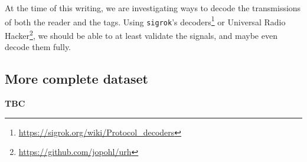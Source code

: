 At the time of this writing, we are investigating ways to decode the transmissions of both the reader and the tags. Using \texttt{sigrok}'s decoders\footnote{\url{https://sigrok.org/wiki/Protocol_decoders}} or Universal Radio Hacker\footnote{\url{https://github.com/jopohl/urh}}, we should be able to at least validate the signals, and maybe even decode them fully.

\subsection{More complete dataset}

\textbf{TBC}
